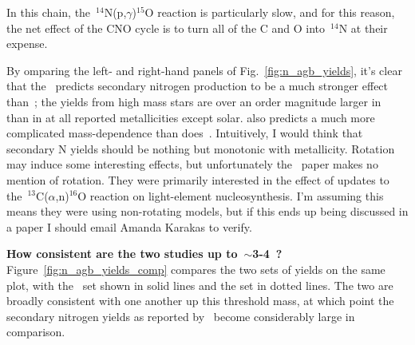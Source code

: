 \documentclass[\main/notes.tex]{subfiles}
\begin{document}
\twolineskip 
In this chain, the~$^{14}$N(p,$\gamma$)$^{15}$O reaction is particularly slow, 
and for this reason, the net effect of the CNO cycle is to turn all of the C 
and O into~$^{14}$N at their expense. 
\par 
By omparing the left- and right-hand panels of Fig.~\ref{fig:n_agb_yields}, 
it's clear that the~\citet{Karakas2010} predicts secondary nitrogen production 
to be a much stronger effect than~\citet{Cristallo2011}; the yields from high 
mass stars are over an order magnitude larger in~\citet{Karakas2010} than in 
\citet{Cristallo2011} at all reported metallicities except solar. 
\citet{Karakas2010} also predicts a much more complicated mass-dependence than 
does~\citet{Cristallo2011}. {\color{red} Intuitively, I would think that 
secondary N yields should be nothing but monotonic with metallicity. Rotation 
may induce some interesting effects, but unfortunately the~\citet{Karakas2010} 
paper makes no mention of rotation. They were primarily interested in the 
effect of updates to the~$^{13}$C($\alpha$,n)$^{16}$O reaction on light-element 
nucleosynthesis. I'm assuming this means they were using non-rotating models, 
but if this ends up being discussed in a paper I should email Amanda Karakas 
to verify. } 
\par 
\textbf{How consistent are the two studies up to~$\sim$3-4~\msun?} 
Figure~\ref{fig:n_agb_yields_comp} compares the two sets of yields on the same 
plot, with the~\citet{Cristallo2011} set shown in solid lines and the 
\citet{Karakas2010} set in dotted lines. 
The two are broadly consistent with one another up this threshold mass, at 
which point the secondary nitrogen yields as reported by~\citet{Karakas2010} 
become considerably large in comparison. 

%   
%  
\biblio 
\end{document}
